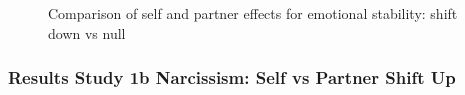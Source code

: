 \documentclass[
  singlecolumn]{article}
\begin{document}
\begin{figure}


\caption{\label{fig-results-emotional-stability-self-partner-down-comparison}Comparison
of self and partner effects for emotional stability: shift down vs null}

\end{figure}%

\newpage{}

\subsubsection{Results Study 1b Narcissism: Self vs Partner Shift
Up}\label{results-study-1b-narcissism-self-vs-partner-shift-up}
\end{document}
